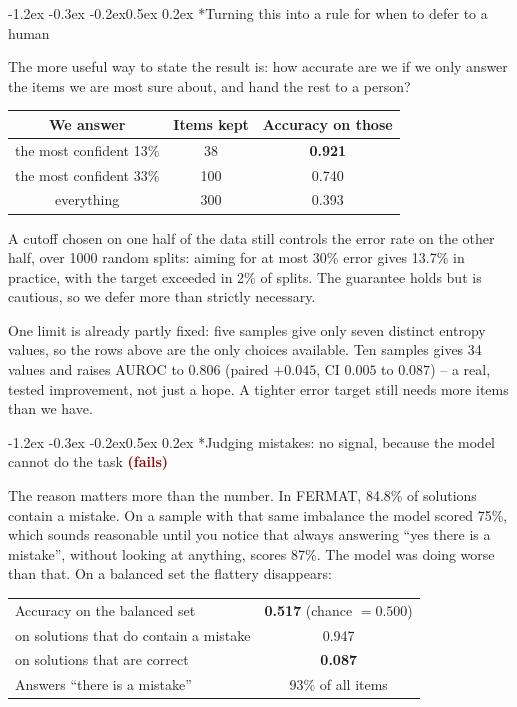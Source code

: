 \documentclass[10pt]{article}
\makeatletter
\newcommand{\failed}[1]{\textcolor{darkred}{\textbf{#1}}}
\renewcommand\subsection{\@startsection{subsection}{2}{\z@}%
  {-1.2ex \@plus -0.3ex \@minus -0.2ex}{0.5ex \@plus 0.2ex}%
  {\normalfont\normalsize\bfseries}}
\makeatother
\begin{document}
\subsection*{Turning this into a rule for when to defer to a human}

The more useful way to state the result is: how accurate are we if we only
answer the items we are most sure about, and hand the rest to a person?

\begin{center}
\small
\begin{tabular}{ccc}
\toprule
We answer & Items kept & Accuracy on those \\
\midrule
the most confident 13\% & 38 & \textbf{0.921} \\
the most confident 33\% & 100 & 0.740 \\
everything & 300 & 0.393 \\
\bottomrule
\end{tabular}
\end{center}

A cutoff chosen on one half of the data still controls the error rate on the
other half, over 1000 random splits: aiming for at most 30\% error gives 13.7\%
in practice, with the target exceeded in 2\% of splits. The guarantee holds but
is cautious, so we defer more than strictly necessary.

One limit is already partly fixed: five samples give only seven distinct
entropy values, so the rows above are the only choices available. Ten samples
gives 34 values and raises AUROC to 0.806 (paired $+0.045$, CI $0.005$ to
$0.087$) -- a real, tested improvement, not just a hope. A tighter error
target still needs more items than we have.

\subsection*{Judging mistakes: no signal, because the model cannot do the task \failed{(fails)}}

The reason matters more than the number. In FERMAT, 84.8\% of solutions contain
a mistake. On a sample with that same imbalance the model scored 75\%, which
sounds reasonable until you notice that always answering ``yes there is a
mistake'', without looking at anything, scores 87\%. The model was doing worse
than that. On a balanced set the flattery disappears:

\begin{center}
\small
\begin{tabular}{lc}
\toprule
Accuracy on the balanced set & \textbf{0.517} \quad (chance $=0.500$) \\
\quad on solutions that do contain a mistake & 0.947 \\
\quad on solutions that are correct & \textbf{0.087} \\
Answers ``there is a mistake'' & 93\% of all items \\
\bottomrule
\end{tabular}
\end{center}
\end{document}
